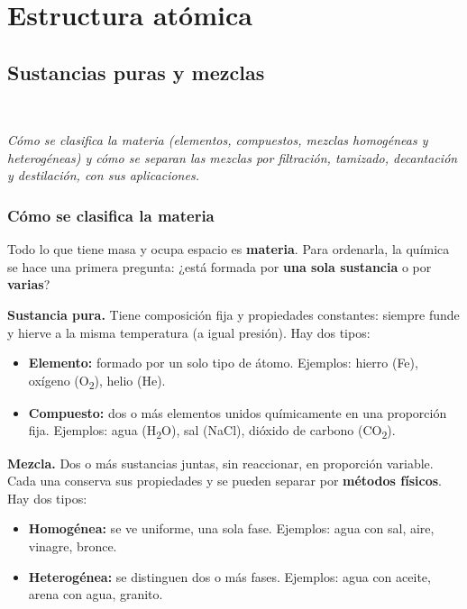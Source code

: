 \chapter{Estructura atómica}
\section[Sustancias puras y mezclas]{Sustancias puras y mezclas}
\modcomun\ \ {\color{gris}\itshape Cómo se clasifica la materia (elementos, compuestos, mezclas homogéneas y heterogéneas) y cómo se separan las mezclas por filtración, tamizado, decantación y destilación, con sus aplicaciones.\par}
\subsection{Cómo se clasifica la materia}
Todo lo que tiene masa y ocupa espacio es \textbf{materia}. Para ordenarla, la química se hace una primera pregunta: ¿está formada por \textbf{una sola sustancia} o por \textbf{varias}?

 

\textbf{Sustancia pura.} Tiene composición fija y propiedades constantes: siempre funde y hierve a la misma temperatura (a igual presión). Hay dos tipos:

 
\begin{itemize}
  \item \textbf{Elemento:} formado por un solo tipo de átomo. Ejemplos: hierro (Fe), oxígeno (O\textsubscript{2}), helio (He).
  \item \textbf{Compuesto:} dos o más elementos unidos químicamente en una proporción fija. Ejemplos: agua (H\textsubscript{2}O), sal (NaCl), dióxido de carbono (CO\textsubscript{2}).
\end{itemize}
 

\textbf{Mezcla.} Dos o más sustancias juntas, sin reaccionar, en proporción variable. Cada una conserva sus propiedades y se pueden separar por \textbf{métodos físicos}. Hay dos tipos:

 
\begin{itemize}
  \item \textbf{Homogénea:} se ve uniforme, una sola fase. Ejemplos: agua con sal, aire, vinagre, bronce.
  \item \textbf{Heterogénea:} se distinguen dos o más fases. Ejemplos: agua con aceite, arena con agua, granito.
\end{itemize}
  
